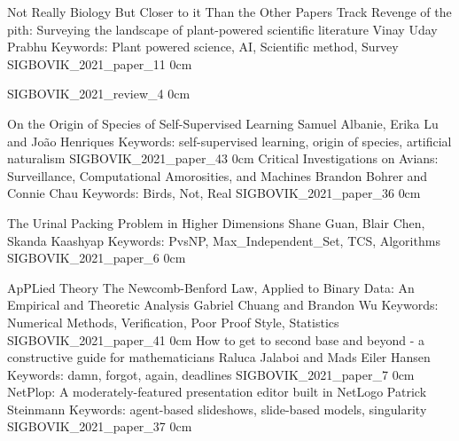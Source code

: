 \addtrack
    {}{Not Really Biology But Closer to it Than the Other Papers Track}
\addpaper
    {Revenge of the pith: Surveying the landscape of plant-powered scientific literature}
    {Vinay Uday Prabhu}
    {Keywords: Plant powered science, AI, Scientific method, Survey}
    {SIGBOVIK_2021_paper_11}
    {0cm}
    {}

\addreview
    {SIGBOVIK_2021_review_4}
    {0cm}


\addpaper
    {On the Origin of Species of Self-Supervised Learning}
    {Samuel Albanie, Erika Lu and João Henriques}
    {Keywords: self-supervised learning, origin of species, artificial naturalism}
    {SIGBOVIK_2021_paper_43}
    {0cm}
    {}
\addpaper
    {Critical Investigations on Avians: Surveillance, Computational Amorosities, and Machines}
    {Brandon Bohrer and Connie Chau}
    {Keywords: Birds, Not, Real}
    {SIGBOVIK_2021_paper_36}
    {0cm}
    {}

\addpaper
    {The Urinal Packing Problem in Higher Dimensions}
    {Shane Guan, Blair Chen, Skanda Kaashyap}
    {Keywords: PvsNP, Max\_Independent\_Set, TCS, Algorithms}
    {SIGBOVIK_2021_paper_6}
    {0cm}
    {}

\addtrack
    {}{ApPLied Theory}
\addpaper
    {The Newcomb-Benford Law, Applied to Binary Data: An Empirical and Theoretic Analysis}
    {Gabriel Chuang and Brandon Wu}
    {Keywords: Numerical Methods, Verification, Poor Proof Style, Statistics}
    {SIGBOVIK_2021_paper_41}
    {0cm}
    {}
\addpaper
    {How to get to second base and beyond - a constructive guide for mathematicians}
    {Raluca Jalaboi and Mads Eiler Hansen}
    {Keywords: damn, forgot, again, deadlines}
    {SIGBOVIK_2021_paper_7}
    {0cm}
    {}
\addpaper
    {NetPlop: A moderately-featured presentation editor built in NetLogo}
    {Patrick Steinmann}
    {Keywords: agent-based slideshows, slide-based models, singularity}
    {SIGBOVIK_2021_paper_37}
    {0cm}
    {}

